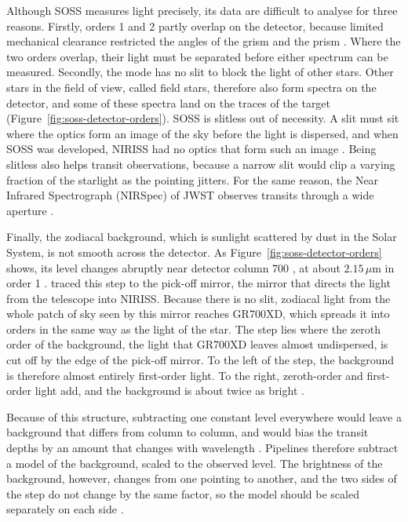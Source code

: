 Although SOSS measures light precisely, its data are difficult to
analyse for three reasons. Firstly, orders 1 and 2 partly overlap on the
detector, because limited mechanical clearance restricted the angles of the
grism and the prism \citep{AlbertEtAl2023}. Where the two orders overlap,
their light must be separated before either spectrum can be measured.
Secondly, the mode has no slit to block the light of other stars. Other stars in the field of view, called field stars, therefore also form spectra on the detector, and some of these spectra land on the traces of the target (Figure~\ref{fig:soss-detector-orders}). SOSS is slitless out of necessity. A slit must sit where the optics form an image of the sky before the light is dispersed, and when SOSS was developed, NIRISS had no optics that form such an image \citep{AlbertEtAl2023}. Being slitless also helps transit observations, because a narrow slit would clip a varying fraction of the starlight as the pointing jitters. For the same reason, the Near Infrared Spectrograph (NIRSpec) of JWST observes transits through a wide aperture \citep{JDoxNIRSpecBOTS2026}.

Finally, the zodiacal background, which is sunlight scattered by dust in the
Solar System, is not smooth across the detector. As Figure~\ref{fig:soss-detector-orders} shows, its level changes abruptly near detector column 700 \citep{AlbertEtAl2023,LouieEtAl2025}, at about $2.15\,\mu\mathrm{m}$ in order 1 \citep{AlbertEtAl2023}.
\citet{AlbertEtAl2023} traced this step to the pick-off mirror, the mirror
that directs the light from the telescope into NIRISS. Because there is no
slit, zodiacal light from the whole patch of sky seen by this mirror reaches
GR700XD, which spreads it into orders in the same way as the light of the
star. The step lies where the zeroth order of the background, the light that
GR700XD leaves almost undispersed, is cut off by the edge of the pick-off
mirror. To the left of the step, the background is therefore almost entirely
first-order light. To the right, zeroth-order and first-order light add, and
the background is about twice as bright \citep{AlbertEtAl2023}.

Because of this structure, subtracting one constant level everywhere would leave a background that differs from column to column, and would bias the transit depths by an amount that changes with wavelength \citep{RadicaEtAl2023}. Pipelines therefore subtract a model of the background, scaled to the observed level. The brightness of the background, however, changes from one pointing to another, and the two sides of the step do not change by the same factor, so the model should be scaled separately on each side \citep{AlbertEtAl2023,LouieEtAl2025}. 


